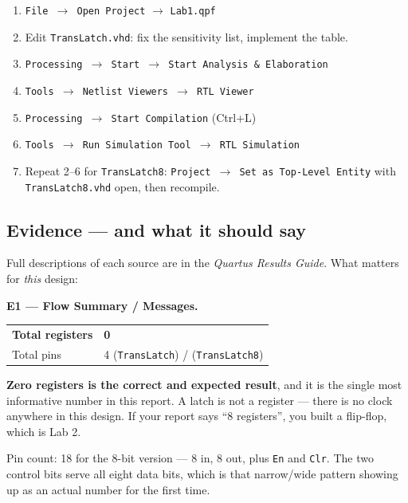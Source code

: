 \documentclass[11pt]{article}
\newcommand{\code}[1]{\texttt{#1}}
\begin{document}
\begin{enumerate}[leftmargin=2em,itemsep=2pt]
\item \code{File $\rightarrow$ Open Project} $\rightarrow$ \code{Lab1.qpf}
\item Edit \code{TransLatch.vhd}: fix the sensitivity list, implement the table.
\item \code{Processing $\rightarrow$ Start $\rightarrow$ Start Analysis \& Elaboration}
\item \code{Tools $\rightarrow$ Netlist Viewers $\rightarrow$ RTL Viewer}
\item \code{Processing $\rightarrow$ Start Compilation} \quad(Ctrl+L)
\item \code{Tools $\rightarrow$ Run Simulation Tool $\rightarrow$ RTL Simulation}
\item Repeat 2--6 for \code{TransLatch8}: \code{Project $\rightarrow$ Set as
Top-Level Entity} with \code{TransLatch8.vhd} open, then recompile.
\end{enumerate}

\subsection*{Evidence --- and what it should say}

Full descriptions of each source are in the \emph{Quartus Results Guide}. What
matters for \emph{this} design:

\vspace{4pt}
\textbf{E1 --- Flow Summary / Messages.}
\begin{center}
\begin{tabular}{ll}
\toprule
\textbf{Total registers} & \textbf{0} \\
Total pins & 4 (\code{TransLatch}) \quad / \quad 18 (\code{TransLatch8}) \\
\bottomrule
\end{tabular}
\end{center}

\textbf{Zero registers is the correct and expected result}, and it is the single most
informative number in this report. A latch is not a register --- there is no clock
anywhere in this design. If your report says ``8 registers'', you built a flip-flop,
which is Lab 2.

Pin count: 18 for the 8-bit version --- 8 in, 8 out, plus \code{En} and \code{Clr}.
The two control bits serve all eight data bits, which is that narrow/wide pattern
showing up as an actual number for the first time.
\end{document}
